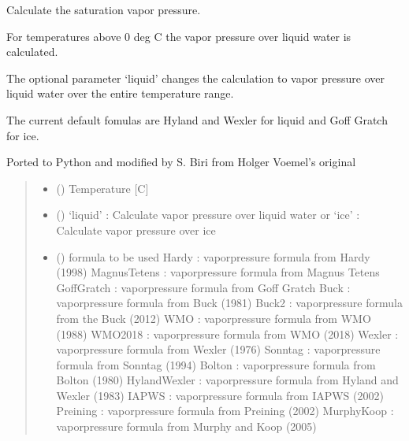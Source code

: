 \documentclass[letterpaper,10pt,english]{sphinxmanual}
\begin{document}
\begin{fulllineitems}
\label{\detokenize{users_guide:AirSeaFluxCode.hum_subs.VaporPressure}}
\pysigstartsignatures
{}
\pysigstopsignatures
\sphinxAtStartPar
Calculate the saturation vapor pressure.

\sphinxAtStartPar
For temperatures above 0 deg C the vapor pressure over liquid water
is calculated.

\sphinxAtStartPar
The optional parameter ‘liquid’ changes the calculation to vapor pressure
over liquid water over the entire temperature range.

\sphinxAtStartPar
The current default fomulas are Hyland and Wexler for liquid and
Goff Gratch for ice.

\sphinxAtStartPar
Ported to Python and modified by S. Biri from Holger Voemel’s original
\begin{quote}\begin{description}
\begin{itemize}
\item {} 
\sphinxAtStartPar
{} () \textendash{} Temperature {[}C{]}

\item {} 
\sphinxAtStartPar
{} () \textendash{} ‘liquid’ : Calculate vapor pressure over liquid water or
‘ice’ : Calculate vapor pressure over ice

\item {} 
\sphinxAtStartPar
{} () \textendash{} formula to be used
Hardy               : vaporpressure formula from Hardy (1998)
MagnusTetens        : vaporpressure formula from Magnus Tetens
GoffGratch          : vaporpressure formula from Goff Gratch
Buck                : vaporpressure formula from Buck (1981)
Buck2               : vaporpressure formula from the Buck (2012)
WMO                 : vaporpressure formula from WMO (1988)
WMO2018             : vaporpressure formula from WMO (2018)
Wexler              : vaporpressure formula from Wexler (1976)
Sonntag             : vaporpressure formula from Sonntag (1994)
Bolton              : vaporpressure formula from Bolton (1980)
HylandWexler        : vaporpressure formula from Hyland and Wexler (1983)
IAPWS               : vaporpressure formula from IAPWS (2002)
Preining            : vaporpressure formula from Preining (2002)
MurphyKoop          : vaporpressure formula from Murphy and Koop (2005)


\end{itemize}
\end{description}
\end{quote}
\end{fulllineitems}
\end{document}
